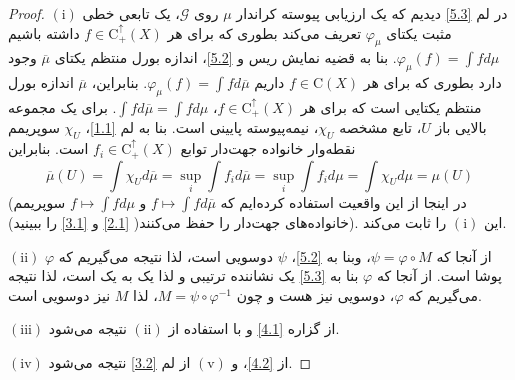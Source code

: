 \documentclass[12pt,a4paper]{article}
\theoremstyle{definition}
\theoremstyle{theorem}
\theoremstyle{definition}
\newcommand{\cG}{\mathcal{G}}
\newcommand{\rC}{\mathrm{C}}
\begin{document}
\begin{proof}
$\mathrm{(i)}$
در لم 
\ref{5.3}
دیدیم که یک ارزیابی پیوسته کراندار 
$ \mu $
روی 
$ \cG $،  یک تابعی خطی مثبت یکتای 
$ \varphi_{\mu} $
تعریف می‌کند بطوری که برای هر 
$ f\in  \rC_{ +}^{\uparrow}(X) $
داشته باشیم
$ .\varphi_{\mu}(f)=\int{f}d\mu $
  بنا به قضیه نمایش ریس و  
\ref{5.2}، اندازه بورل منتظم یکتای 
$ \overline{\mu} $ وجود دارد 
بطوری که برای هر 
$ f\in \rC(X) $
داریم
$ \varphi_{\mu}(f)=\int{f}d\overline{\mu} $.   بنابراین،  
$ \overline{\mu} $
اندازه بورل منتظم یکتایی است که برای هر 
$ f\in  \rC_{ +}^{\uparrow}(X) $،
$ \int{f}d\overline{\mu}=\int{f}d\mu $.    برای یک مجموعه بالایی باز 
$U$،  تابع مشخصه \linebreak
$ \chi_{U} $،  نیمه‌پیوسته پایینی است.   بنا به لم
\ref{1.1}،  
$ \chi_{U} $
سوپریمم نقطه‌وار خانواده جهت‌دار توابع
$ f_{i}\in \rC_{ +}^{\uparrow}(X)$
است.   بنابراین 
$$ \overline{\mu}(U)=\int{\chi_{U}}d\overline{\mu}=\sup_{i} \int{f_{i}}d\overline{\mu}=\sup_{i}\int{f_{i}}d\mu=\int{\chi_{U}}d\mu=\mu(U) $$
  (در اینجا از این واقعیت استفاده کرده‌ایم که 
$ f\mapsto \int{f}d\overline{\mu} $
و
$ f\mapsto \int{f}d\mu $
سوپریمم خانواده‌های جهت‌دار را حفظ می‌کنند(
\ref{2.1}
و
\ref{3.1}
را ببینید)).   این
$\mathrm{(i)}$
را ثابت می‌کند.


$\mathrm{(ii)}$
از آنجا که 
$ \psi=\varphi \circ M $،  وبنا به 
\ref{5.2}،   
$ \psi $
دوسویی است،  لذا نتیجه می‌گیریم که 
$ \varphi $
پوشا است.  از آنجا که 
$ \varphi $
بنا به
\ref{5.3}
یک نشاننده ترتیبی و لذا یک به یک است،  لذا نتیجه می‌گیریم که 
$\varphi  $،  دوسویی نیز هست و چون 
$ M=\psi\circ \varphi^{-1} $،  لذا $ M $ نیز دوسویی  است.


$\mathrm{(iii)}$
از گزاره
\ref{4.1}
و با استفاده از 
$ \mathrm{(ii)} $
نتیجه می‌شود.


$ \mathrm{(iv)} $
از
\ref{4.2}،   و
$ \mathrm{(v)} $
از لم
\ref{3.2}
  نتیجه می‌شود.
\end{proof}
\end{document}
